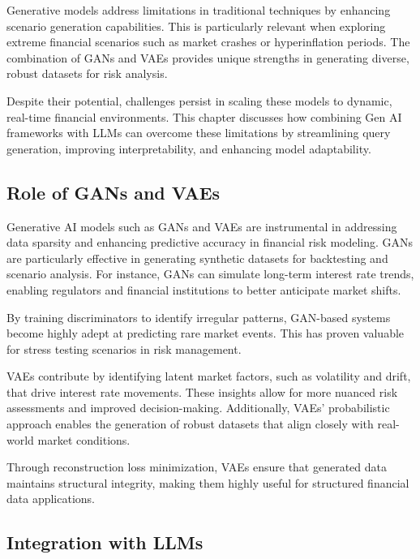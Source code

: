 \documentclass[a4paper,12pt]{scrbook}
\begin{document}
	Generative models address limitations in traditional techniques by enhancing scenario generation capabilities. This is particularly relevant when exploring extreme financial scenarios such as market crashes or hyperinflation periods. The combination of GANs and VAEs provides unique strengths in generating diverse, robust datasets for risk analysis.
	
	Despite their potential, challenges persist in scaling these models to dynamic, real-time financial environments. This chapter discusses how combining Gen AI frameworks with LLMs can overcome these limitations by streamlining query generation, improving interpretability, and enhancing model adaptability.
	
	
	\subsection{Role of GANs and VAEs}
	
	Generative AI models such as GANs and VAEs are instrumental in addressing data sparsity and enhancing predictive accuracy in financial risk modeling. GANs are particularly effective in generating synthetic datasets for backtesting and scenario analysis. For instance, GANs can simulate long-term interest rate trends, enabling regulators and financial institutions to better anticipate market shifts.
	
	By training discriminators to identify irregular patterns, GAN-based systems become highly adept at predicting rare market events. This has proven valuable for stress testing scenarios in risk management.
	
	VAEs contribute by identifying latent market factors, such as volatility and drift, that drive interest rate movements. These insights allow for more nuanced risk assessments and improved decision-making. Additionally, VAEs’ probabilistic approach enables the generation of robust datasets that align closely with real-world market conditions.
	
	Through reconstruction loss minimization, VAEs ensure that generated data maintains structural integrity, making them highly useful for structured financial data applications.
	
	\subsection{Integration with LLMs}
	
\end{document}
